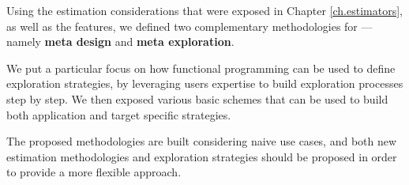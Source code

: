         Using the estimation considerations that were exposed in Chapter \ref{ch.estimators}, as well as the  features, we defined two complementary methodologies for  --- namely {\bf meta design} and {\bf meta exploration}.

        We put a particular focus on how functional programming can be used to define exploration strategies, by leveraging users expertise to build exploration processes step by step.
        We then exposed various basic schemes that can be used to build both application and target specific strategies.

        The proposed methodologies are built considering naive use cases, and both new estimation methodologies and exploration strategies should be proposed in order to provide a more flexible approach.
        

